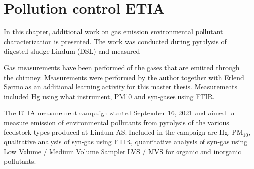 \chapter{Pollution control ETIA}\label{appSec:pollution}

In this chapter, additional work on gas emission environmental pollutant characterization is presented. The work was conducted during pyrolysis of digested sludge Lindum (DSL) and measured

Gas measurements have been performed of the gases that are emitted through the chimney. Measurements were performed by the author together with Erlend S\o rmo as an additional learning activity for this master thesis. Measurements included Hg using what instrument, PM10 and syn-gases using FTIR.

The ETIA measurement campaign started September 16, 2021 and aimed to measure emission of environmental pollutants from pyrolysis of the various feedstock types produced at Lindum AS. Included in the campaign are Hg, PM$_{10}$, qualitative analysis of syn-gas using FTIR, quantitative analysis of syn-gas using Low Volume / Medium Volume Sampler LVS / MVS for organic and inorganic pollutants. 


